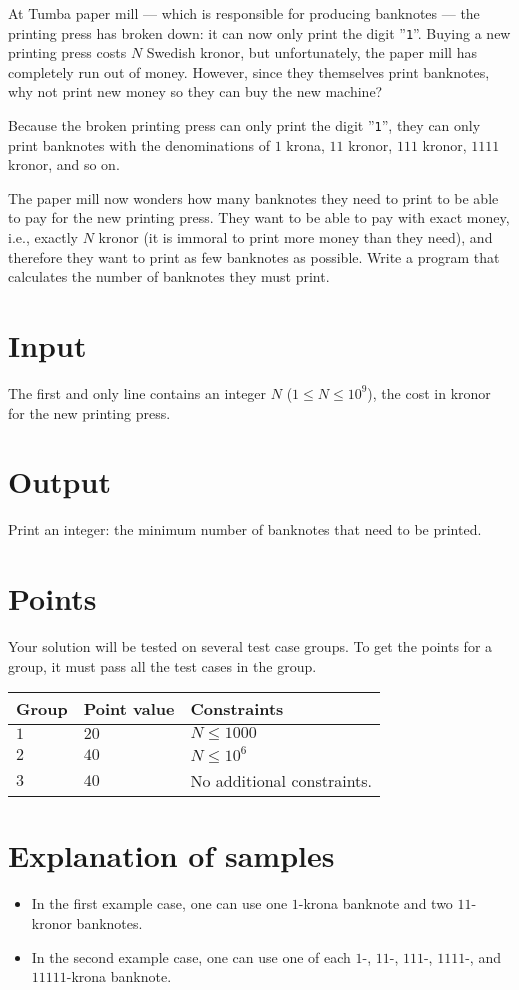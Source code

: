
At Tumba paper mill --- which is responsible for producing banknotes --- the printing press has broken down:
it can now only print the digit ”\texttt{1}”.
Buying a new printing press costs $N$ Swedish kronor, but unfortunately, the paper mill has completely run out of money.
However, since they themselves print banknotes, why not print new money so they can buy the new machine?

Because the broken printing press can only print the digit ”\texttt{1}”, they can only print banknotes with
the denominations of $1$ krona, $11$ kronor, $111$ kronor, $1111$ kronor, and so on.

The paper mill now wonders how many banknotes they need to print to be able to pay for the new printing press.
They want to be able to pay with exact money, i.e., exactly $N$ kronor (it is immoral to print more money than they need),
and therefore they want to print as few banknotes as possible.
Write a program that calculates the number of banknotes they must print.

\section*{Input}
The first and only line contains an integer $N$ ($1 \leq N \leq 10^9$), the cost in kronor for the new printing press.

\section*{Output}
Print an integer: the minimum number of banknotes that need to be printed.

\section*{Points}
Your solution will be tested on several test case groups.
To get the points for a group, it must pass all the test cases in the group.

\noindent
\begin{tabular}{| l | l | p{12cm} |}
  \hline
  \textbf{Group} & \textbf{Point value} & \textbf{Constraints} \\ \hline
  $1$    & $20$        &  $ N \leq 1000 $ \\ \hline 
  $2$    & $40$        &  $ N \leq 10^6 $ \\ \hline
  $3$    & $40$        &  No additional constraints. \\ \hline
\end{tabular}



\section*{Explanation of samples}
\begin{itemize}
  \item In the first example case, one can use one $1$-krona banknote and two $11$-kronor banknotes.
  \item In the second example case, one can use one of each $1$-, $11$-, $111$-, $1111$-, and $11111$-krona banknote.
\end{itemize}
